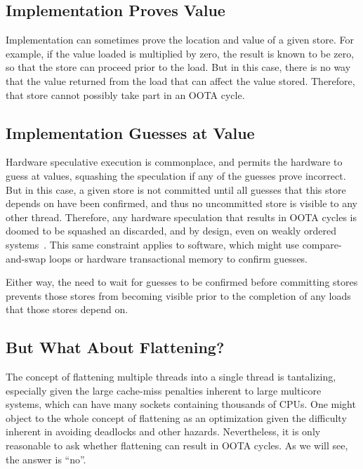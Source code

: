 \documentclass[10]{article}
\begin{document}
\subsection{Implementation Proves Value}
\label{sec:Implementation Proves Value}

Implementation can sometimes prove the location and value of a given
store.
For example, if the value loaded is multiplied by zero, the result
is known to be zero, so that the store can proceed prior to the load.
But in this case, there is no way that the value returned from
the load that can affect the value stored.
Therefore, that store cannot possibly take part in an OOTA cycle.

\subsection{Implementation Guesses at Value}
\label{sec:Implementation Guesses at Value}

Hardware speculative execution is commonplace, and permits the
hardware to guess at values, squashing the speculation if any
of the guesses prove incorrect.
But in this case, a given store is not committed until all guesses that
this store depends on have been confirmed, and thus no uncommitted store
is visible to any other thread.
Therefore, any hardware speculation that results in OOTA cycles is doomed
to be squashed an discarded, and by design, even on weakly ordered
systems~\cite{ARMv7A:2010,ARMv8A:2017,PowerISA2.07-2013}.
This same constraint applies to software, which might use compare-and-swap
loops or hardware transactional memory to confirm guesses.

Either way, the need to wait for guesses to be confirmed before committing
stores prevents those stores from becoming visible prior to the
completion of any loads that those stores depend on.

\subsection{But What About Flattening?}
\label{sec:But What About Flattening?}

The concept of flattening multiple threads into a single thread is
tantalizing, especially given the large cache-miss penalties inherent
to large multicore systems, which can have many sockets containing
thousands of CPUs.
One might object to the whole concept of flattening as an
optimization given the difficulty inherent in avoiding deadlocks
and other hazards.
Nevertheless, it is only reasonable to ask whether flattening can
result in OOTA cycles.
As we will see, the answer is ``no''.
\end{document}

